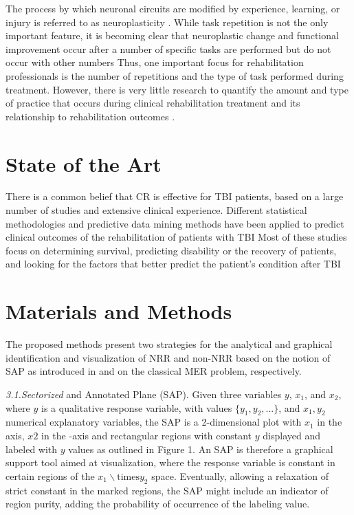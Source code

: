 {The process by which neuronal circuits are modified by
experience, learning, or injury is referred to as neuroplasticity
\cite{biblref7}.
While task repetition is not the only important feature,
it is becoming clear that neuroplastic change and functional
improvement occur after a number of specific tasks are
performed but do not occur with other numbers \cite{biblref8,biblref9} Thus,
one important focus for rehabilitation professionals is the
number of repetitions and the type of task performed during
treatment. However, there is very little research to quantify
the amount and type of practice that occurs during clinical
rehabilitation treatment and its relationship to rehabilitation
outcomes \cite{biblref10,biblref11}.



\section{State of the Art} 
\label{sec1}


There is a common belief that CR is effective for TBI patients,
based on a large number of studies and extensive clinical
experience. Different statistical methodologies and predictive
data mining methods have been applied to predict clinical
outcomes of the rehabilitation of patients with TBI \cite{biblref14,biblref16} Most of these studies focus on determining survival,
predicting disability or the recovery of patients, and looking
for the factors that better predict the patient’s condition after
TBI

\section{Materials and Methods}
\label{sec2}
The proposed methods present two strategies for the analytical and graphical identification and visualization of NRR and
non-NRR based on the notion of SAP as introduced in \cite{biblref12}
and on the classical MER problem, respectively.

\textit{3.1.Sectorized} and Annotated Plane (SAP). Given three
variables $y$, $x_1$, and $x_2$, where $y$ is a qualitative response
variable, with values ${\{y_1,y_2,...}\}$, and $x_1, y_2$ numerical
explanatory variables, the SAP is a 2-dimensional plot with
$x_1$ in the axis, $x2$ in the -axis and rectangular regions
with constant $y$ displayed and labeled with $y$ values as
outlined in Figure 1. An SAP is therefore a graphical support
tool aimed at visualization, where the response variable is
constant in certain regions of the $ x_1  \backslash \text{times}  y_2 $ space. Eventually,
allowing a relaxation of strict constant in the marked
regions, the SAP might include an indicator of region purity,
adding the probability of occurrence of the labeling value.

}
